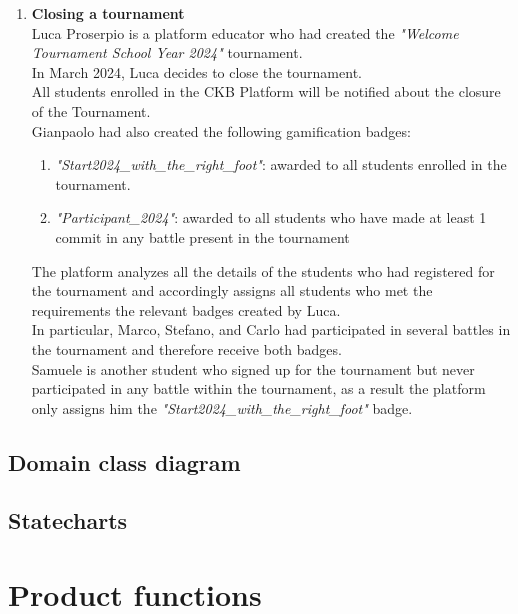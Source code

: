 \begin{enumerate}
	\item \textbf{Closing a tournament}\\
	      Luca Proserpio is a platform educator who had created the \emph{"Welcome Tournament School Year 2024"} tournament.\\
	      In March 2024, Luca decides to close the tournament.\\
	      All students enrolled in the CKB Platform will be notified about the closure of the Tournament.\\
	      Gianpaolo had also created the following gamification badges:
	      \begin{enumerate}
		      \item \emph{"Start2024_with_the_right_foot"}: awarded to all students enrolled in the tournament.
		      \item \emph{"Participant_2024"}: awarded to all students who have made at least 1 commit in any battle present in the tournament
	      \end{enumerate}
	      The platform analyzes all the details of the students who had registered for the tournament and accordingly assigns all students who met the requirements the relevant badges created by Luca.\\
	      In particular, Marco, Stefano, and Carlo had participated in several battles in the tournament and therefore receive both badges.\\
	      Samuele is another student who signed up for the tournament but never participated in any battle within the tournament, as a result the platform only assigns him the \emph{"Start2024_with_the_right_foot"} badge.

\end{enumerate}


\subsection{Domain class diagram}

\subsection{Statecharts}




\section{Product functions}



